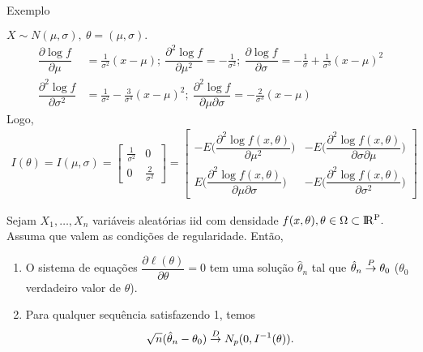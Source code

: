 \documentclass[12pt]{beamer}
\begin{document}
\begin{frame}{Exemplo}
\begin{block}{}
\justifying
$X\sim N(\mu,\sigma),~\theta=(\mu,\sigma).$
\begin{align*}
    \dfrac{\partial\log{f}}{\partial\mu}&=\frac{1}{\sigma^{2}}(x-\mu);~\dfrac{\partial^{2}\log{f}}{\partial\mu^{2}}=-\frac{1}{\sigma^{2}};~\dfrac{\partial\log{f}}{\partial\sigma}=-\frac{1}{\sigma}+\frac{1}{\sigma^{3}}(x-\mu)^{2}\\
    \dfrac{\partial^{2}\log{f}}{\partial\sigma^{2}}&=\frac{1}{\sigma^{2}}-\frac{3}{\sigma^{4}}(x-\mu)^{2};~\dfrac{\partial^{2}\log{f}}{\partial\mu\partial\sigma}=-\frac{2}{\sigma^{3}}(x-\mu)
\end{align*}
Logo,
{\small
\begin{align*}
I(\theta)=I(\mu,\sigma)=\begin{bmatrix}
       \frac{1}{\sigma^{2}} & 0\\[0.3em]
       0 & \frac{2}{\sigma^{2}}
\end{bmatrix}=\begin{bmatrix}
       -E\Big(\dfrac{\partial^{2}\log{f(x,\theta)}}{\partial\mu^{2}}\Big)      & -E\Big(\dfrac{\partial^{2}\log{f(x,\theta)}}{\partial\sigma\partial\mu}\Big)\\[0.3em]
       E\Big(\dfrac{\partial^{2}\log{f(x,\theta)}}{\partial\mu\partial\sigma}\Big)& -E\Big(\dfrac{\partial^{2}\log{f(x,\theta)}}{\partial\sigma^{2}}\Big)
\end{bmatrix}
\end{align*}
}
\end{block}
\end{frame}

\begin{frame}{}
\begin{Teorema}{}
\justifying
Sejam $X_{1},\ldots,X_{n}$ variáveis aleatórias iid com densidade $f(x,\theta),\theta\in\Omega\subset\rm I\!R^{P}.$ Assuma que valem as condições de regularidade. Então,
\begin{enumerate}
    \item O sistema de equações $\dfrac{\partial\ell(\theta)}{\partial\theta}=0$ tem uma solução $\hat{\theta}_{n}$ tal que $\hat{\theta}_{n}\overset{P}{\rightarrow} \theta_{0}$ ($\theta_{0}$ verdadeiro valor de $\theta$).
    \item Para qualquer sequência satisfazendo 1, temos $$\sqrt{n}(\hat{\theta}_{n}-\theta_{0})\overset{D}{\rightarrow} N_{p}(0,I^{-1}(\theta)).$$
\end{enumerate}
\end{Teorema}
\end{frame}
\end{document}
